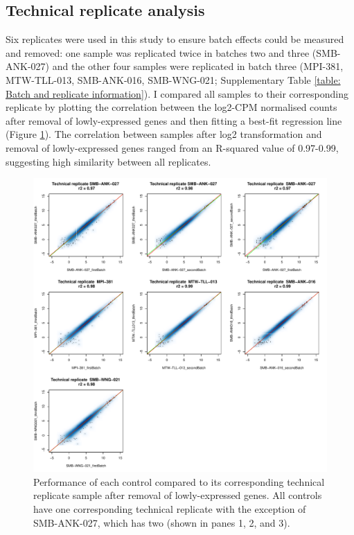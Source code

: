 \documentclass[12pt,a4paper,titlepage,twoside,openright]{book}
\begin{document}
\begin{mainmatter}
{\section{Technical replicate analysis}
Six replicates were used in this study to ensure batch effects could be measured and removed: one sample was replicated twice in batches two and three (SMB-ANK-027) and the other four samples were replicated in batch three (MPI-381, MTW-TLL-013, SMB-ANK-016, SMB-WNG-021; Supplementary Table \ref{table: Batch and replicate information}). I compared all samples to their corresponding replicate by plotting the correlation between the log2-CPM normalised counts after removal of lowly-expressed genes and then fitting a best-fit regression line (Figure \ref{fig:Replicate Comparisons}). The correlation between samples after log2 transformation and removal of lowly-expressed genes ranged from an R-squared value of 0.97-0.99, suggesting high similarity between all replicates.
\begin{figure}[h!]
\centering
\includegraphics[width=\textwidth,height=\textheight,keepaspectratio]{Figures/replicate_comparisons_postFiltering_123Combined.pdf}
\caption{Performance of each control compared to its corresponding technical replicate sample after removal of lowly-expressed genes. All controls have one corresponding technical replicate with the exception of SMB-ANK-027, which has two (shown in panes 1, 2, and 3).}
\label{fig:Replicate Comparisons}
\end{figure}

}
\end{mainmatter}
\end{document}
